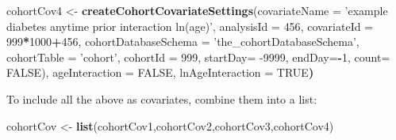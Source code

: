\documentclass[
]{article}
\newenvironment{Shaded}{\begin{snugshade}}{\end{snugshade}}
\newcommand{\DataTypeTok}[1]{\textcolor[rgb]{0.13,0.29,0.53}{#1}}
\newcommand{\DecValTok}[1]{\textcolor[rgb]{0.00,0.00,0.81}{#1}}
\newcommand{\ErrorTok}[1]{\textcolor[rgb]{0.64,0.00,0.00}{\textbf{#1}}}
\newcommand{\KeywordTok}[1]{\textcolor[rgb]{0.13,0.29,0.53}{\textbf{#1}}}
\newcommand{\NormalTok}[1]{#1}
\newcommand{\OperatorTok}[1]{\textcolor[rgb]{0.81,0.36,0.00}{\textbf{#1}}}
\newcommand{\OtherTok}[1]{\textcolor[rgb]{0.56,0.35,0.01}{#1}}
\newcommand{\StringTok}[1]{\textcolor[rgb]{0.31,0.60,0.02}{#1}}
\begin{document}
\begin{Shaded}
\begin{Highlighting}[]
\NormalTok{cohortCov4 <-}\StringTok{ }\KeywordTok{createCohortCovariateSettings}\NormalTok{(}\DataTypeTok{covariateName =} \StringTok{'example diabetes anytime prior interaction ln(age)'}\NormalTok{,}
                                                        \DataTypeTok{analysisId =} \DecValTok{456}\NormalTok{,}
                                                        \DataTypeTok{covariateId =} \DecValTok{999}\OperatorTok{*}\DecValTok{1000}\OperatorTok{+}\DecValTok{456}\NormalTok{,}
                                                      \DataTypeTok{cohortDatabaseSchema =} \StringTok{'the_cohortDatabaseSchema'}\NormalTok{,}
                                                      \DataTypeTok{cohortTable =} \StringTok{'cohort'}\NormalTok{,}
                                                      \DataTypeTok{cohortId =} \DecValTok{999}\NormalTok{,}
                                                      \DataTypeTok{startDay=} \DecValTok{-9999}\NormalTok{, }
                                                      \DataTypeTok{endDay=}\OperatorTok{-}\DecValTok{1}\NormalTok{,}
                                                      \DataTypeTok{count=} \OtherTok{FALSE}\NormalTok{), }
\NormalTok{                                                      ageInteraction =}\StringTok{ }\OtherTok{FALSE}\NormalTok{,}
\NormalTok{                                                      lnAgeInteraction =}\StringTok{ }\OtherTok{TRUE}\ErrorTok{)}
\end{Highlighting}
\end{Shaded}

To include all the above as covariates, combine them into a list:

\begin{Shaded}
\begin{Highlighting}[]
\NormalTok{cohortCov <-}\StringTok{ }\KeywordTok{list}\NormalTok{(cohortCov1,cohortCov2,cohortCov3,cohortCov4)}
\end{Highlighting}
\end{Shaded}
\end{document}

